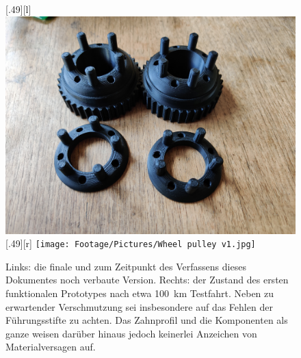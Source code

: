 	\begin{figure}[h]
		\centering
		[.49\textwidth][l]{
			\includegraphics[angle=180, width=.49\textwidth]{Footage/Pictures/Wheel pulley v2.jpg}
		}
		[.49\textwidth][r]{
			\texttt{[image: Footage/Pictures/Wheel pulley v1.jpg]}
		}
		\caption[Vergleich der gedruckten Zahn- und Konterscheiben vor und nach mehreren Testfahrten]{Links: die finale und zum Zeitpunkt des Verfassens dieses Dokumentes noch verbaute Version. Rechts: der Zustand des ersten funktionalen Prototypes nach etwa \qty{100}{\kilo\metre} Testfahrt. Neben zu erwartender Verschmutzung sei insbesondere auf das Fehlen der Führungsstifte zu achten. Das Zahnprofil und die Komponenten als ganze weisen darüber hinaus jedoch keinerlei Anzeichen von Materialversagen auf.}
		\label{fig:comparison printed parts used unused}
	\end{figure}